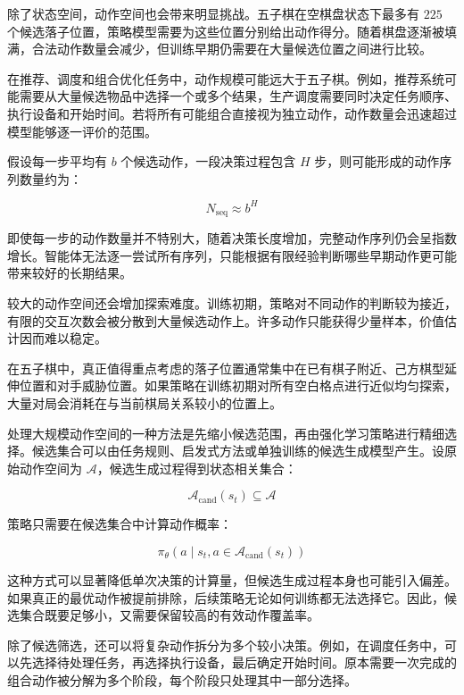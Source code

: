 除了状态空间，动作空间也会带来明显挑战。五子棋在空棋盘状态下最多有 $225$ 个候选落子位置，策略模型需要为这些位置分别给出动作得分。随着棋盘逐渐被填满，合法动作数量会减少，但训练早期仍需要在大量候选位置之间进行比较。

在推荐、调度和组合优化任务中，动作规模可能远大于五子棋。例如，推荐系统可能需要从大量候选物品中选择一个或多个结果，生产调度需要同时决定任务顺序、执行设备和开始时间。若将所有可能组合直接视为独立动作，动作数量会迅速超过模型能够逐一评价的范围。

假设每一步平均有 $b$ 个候选动作，一段决策过程包含 $H$ 步，则可能形成的动作序列数量约为：

\begin{equation}
N_{\mathrm{seq}}
\approx
b^H
\end{equation}

即使每一步的动作数量并不特别大，随着决策长度增加，完整动作序列仍会呈指数增长。智能体无法逐一尝试所有序列，只能根据有限经验判断哪些早期动作更可能带来较好的长期结果。

较大的动作空间还会增加探索难度。训练初期，策略对不同动作的判断较为接近，有限的交互次数会被分散到大量候选动作上。许多动作只能获得少量样本，价值估计因而难以稳定。

在五子棋中，真正值得重点考虑的落子位置通常集中在已有棋子附近、己方棋型延伸位置和对手威胁位置。如果策略在训练初期对所有空白格点进行近似均匀探索，大量对局会消耗在与当前棋局关系较小的位置上。

处理大规模动作空间的一种方法是先缩小候选范围，再由强化学习策略进行精细选择。候选集合可以由任务规则、启发式方法或单独训练的候选生成模型产生。设原始动作空间为 $\mathcal{A}$，候选生成过程得到状态相关集合：

\begin{equation}
\mathcal{A}_{\mathrm{cand}}(s_t)
\subseteq
\mathcal{A}
\end{equation}

策略只需要在候选集合中计算动作概率：

\begin{equation}
\pi_{\theta}
\left(
a\mid s_t,
a\in\mathcal{A}_{\mathrm{cand}}(s_t)
\right)
\end{equation}

这种方式可以显著降低单次决策的计算量，但候选生成过程本身也可能引入偏差。如果真正的最优动作被提前排除，后续策略无论如何训练都无法选择它。因此，候选集合既要足够小，又需要保留较高的有效动作覆盖率。


除了候选筛选，还可以将复杂动作拆分为多个较小决策。例如，在调度任务中，可以先选择待处理任务，再选择执行设备，最后确定开始时间。原本需要一次完成的组合动作被分解为多个阶段，每个阶段只处理其中一部分选择。


